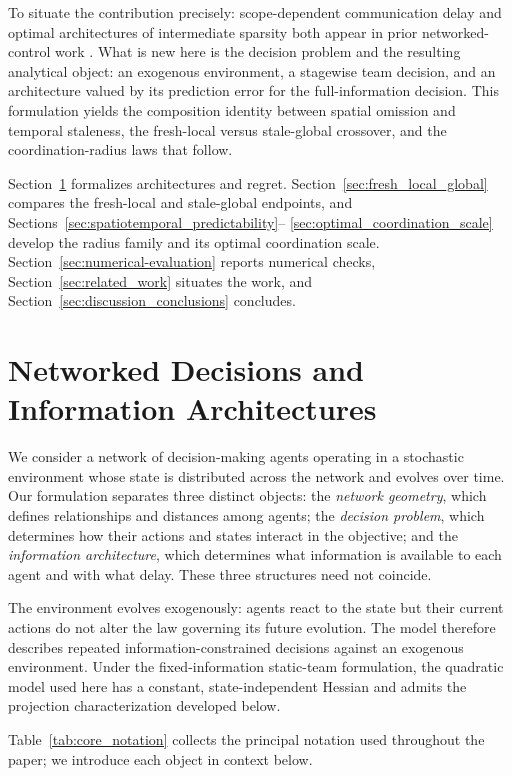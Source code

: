 \documentclass[11pt]{article}
\begin{document}
To situate the contribution precisely: scope-dependent communication delay and
optimal architectures of intermediate sparsity both appear in prior
networked-control work \cite{ballotta2023latency,ballotta2023sparser,
vanka2010power,ballotta2026role}. What is new here is the decision problem and
the resulting analytical object: an exogenous environment, a stagewise team
decision, and an architecture valued by its prediction error for the
full-information decision. This formulation yields the composition identity
between spatial omission and temporal staleness, the fresh-local versus
stale-global crossover, and the coordination-radius laws that follow.

Section~\ref{sec:model} formalizes architectures and regret.
Section~\ref{sec:fresh_local_global} compares the fresh-local and stale-global
endpoints, and Sections~\ref{sec:spatiotemporal_predictability}--
\ref{sec:optimal_coordination_scale} develop the radius family and its optimal
coordination scale. Section~\ref{sec:numerical-evaluation} reports numerical
checks, Section~\ref{sec:related_work} situates the work, and
Section~\ref{sec:discussion_conclusions} concludes.

\section{Networked Decisions and Information Architectures}
\label{sec:model}

We consider a network of decision-making agents operating in a stochastic
environment whose state is distributed across the network and evolves over
time. Our formulation separates three distinct objects: the
\emph{network geometry}, which defines relationships and distances among
agents; the \emph{decision problem}, which determines how their actions and
states interact in the objective; and the \emph{information architecture},
which determines what information is available to each agent and with what
delay. These three structures need not coincide.

The environment evolves exogenously: agents react to the state but their
current actions do not alter the law governing its future evolution. The model
therefore describes repeated information-constrained decisions against an
exogenous environment. Under the fixed-information static-team
formulation, the quadratic model used here has a constant, state-independent
Hessian and admits the projection characterization developed below.

Table~\ref{tab:core_notation} collects the principal notation used throughout
the paper; we introduce each object in context below.
\end{document}
